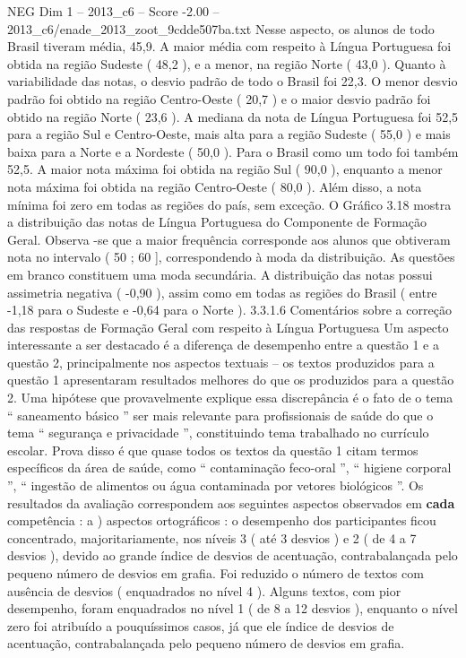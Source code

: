 \begin{textsample}{NEG Dim 1 – 2013\_c6 – Score -2.00 – 2013\_c6/enade\_2013\_zoot\_9cdde507ba.txt}
Nesse aspecto, os alunos de todo Brasil tiveram média, 45,9.
A maior média com respeito à Língua Portuguesa foi obtida na região Sudeste ( 48,2 ), e a menor, na região Norte ( 43,0 ).
Quanto à variabilidade das notas, o desvio padrão de todo o Brasil foi 22,3.
O menor desvio padrão foi obtido na região Centro-Oeste ( 20,7 ) e o maior desvio padrão foi obtido na região Norte ( 23,6 ).
A mediana da nota de Língua Portuguesa foi 52,5 para a região Sul e Centro-Oeste, mais alta para a região Sudeste ( 55,0 ) e mais baixa para a Norte e a Nordeste ( 50,0 ).
Para o Brasil como um todo foi também 52,5.
A maior nota máxima foi obtida na região Sul ( 90,0 ), enquanto a menor nota máxima foi obtida na região Centro-Oeste ( 80,0 ).
Além disso, a nota mínima foi zero em todas as regiões do país, sem exceção.
O Gráfico 3.18 mostra a distribuição das notas de Língua Portuguesa do Componente de Formação Geral.
Observa -se que a maior frequência corresponde aos alunos que obtiveram nota no intervalo ( 50 ; 60 ], correspondendo à moda da distribuição.
As questões em branco constituem uma moda secundária.
A distribuição das notas possui assimetria negativa ( -0,90 ), assim como em todas as regiões do Brasil ( entre -1,18 para o Sudeste e -0,64 para o Norte ). 3.3.1.6 Comentários sobre a correção das respostas de Formação Geral com respeito à Língua Portuguesa Um aspecto interessante a ser destacado é a diferença de desempenho entre a questão 1 e a questão 2, principalmente nos aspectos textuais – os textos produzidos para a questão 1 apresentaram resultados melhores do que os produzidos para a questão 2.
Uma hipótese que provavelmente explique essa discrepância é o fato de o tema “ saneamento básico ” ser mais relevante para profissionais de saúde do que o tema “ segurança e privacidade ”, constituindo tema trabalhado no currículo escolar.
Prova disso é que quase todos os textos da questão 1 citam termos específicos da área de saúde, como “ contaminação feco-oral ”, “ higiene corporal ”, “ ingestão de alimentos ou água contaminada por vetores biológicos ”.
Os resultados da avaliação correspondem aos seguintes aspectos observados em \textbf{cada} competência : a ) aspectos ortográficos : o desempenho dos participantes ficou concentrado, majoritariamente, nos níveis 3 ( até 3 desvios ) e 2 ( de 4 a 7 desvios ), devido ao grande índice de desvios de acentuação, contrabalançada pelo pequeno número de desvios em grafia.
Foi reduzido o número de textos com ausência de desvios ( enquadrados no nível 4 ).
Alguns textos, com pior desempenho, foram enquadrados no nível 1 ( de 8 a 12 desvios ), enquanto o nível zero foi atribuído a pouquíssimos casos, já que ele índice de desvios de acentuação, contrabalançada pelo pequeno número de desvios em grafia.

\end{textsample}
